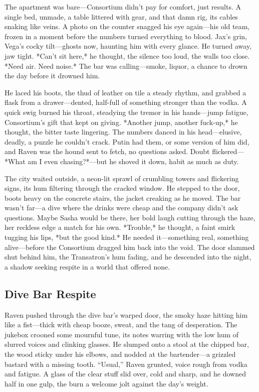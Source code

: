 \documentclass[12pt]{book}
\begin{document}
The apartment was bare—Consortium didn’t pay for comfort, just results. A single bed, unmade, a table littered with gear, and that damn rig, its cables snaking like veins. A photo on the counter snagged his eye again—his old team, frozen in a moment before the numbers turned everything to blood. Jax’s grin, Vega’s cocky tilt—ghosts now, haunting him with every glance. He turned away, jaw tight. *Can’t sit here,* he thought, the silence too loud, the walls too close. *Need air. Need noise.* The bar was calling—smoke, liquor, a chance to drown the day before it drowned him.

He laced his boots, the thud of leather on tile a steady rhythm, and grabbed a flask from a drawer—dented, half-full of something stronger than the vodka. A quick swig burned his throat, steadying the tremor in his hands—jump fatigue, Consortium’s gift that kept on giving. *Another jump, another fuck-up,* he thought, the bitter taste lingering. The numbers danced in his head—elusive, deadly, a puzzle he couldn’t crack. Putin had them, or some version of him did, and Raven was the hound sent to fetch, no questions asked. Doubt flickered—*What am I even chasing?*—but he shoved it down, habit as much as duty.

The city waited outside, a neon-lit sprawl of crumbling towers and flickering signs, its hum filtering through the cracked window. He stepped to the door, boots heavy on the concrete stairs, the jacket creaking as he moved. The bar wasn’t far—a dive where the drinks were cheap and the company didn’t ask questions. Maybe Sasha would be there, her bold laugh cutting through the haze, her reckless edge a match for his own. *Trouble,* he thought, a faint smirk tugging his lips, *but the good kind.* He needed it—something real, something alive—before the Consortium dragged him back into the void. The door slammed shut behind him, the Transatron’s hum fading, and he descended into the night, a shadow seeking respite in a world that offered none.

\subsection{Dive Bar Respite}

Raven pushed through the dive bar’s warped door, the smoky haze hitting him like a fist—thick with cheap booze, sweat, and the tang of desperation. The jukebox crooned some mournful tune, its notes warring with the low hum of slurred voices and clinking glasses. He slumped onto a stool at the chipped bar, the wood sticky under his elbows, and nodded at the bartender—a grizzled bastard with a missing tooth. “Usual,” Raven grunted, voice rough from vodka and fatigue. A glass of the clear stuff slid over, cold and sharp, and he downed half in one gulp, the burn a welcome jolt against the day’s weight.
\end{document}
